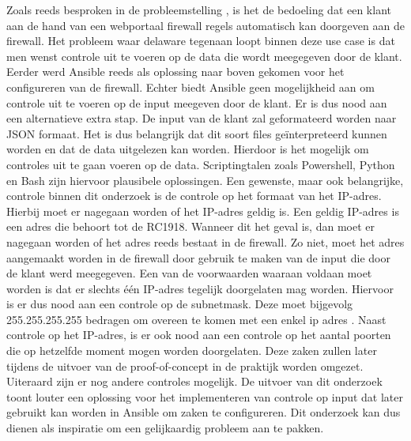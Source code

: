 Zoals reeds besproken in de probleemstelling , is het de bedoeling dat een klant aan de hand van een webportaal firewall regels automatisch kan doorgeven aan de firewall. Het probleem waar delaware tegenaan loopt binnen deze use case is dat men wenst controle uit te voeren op de data die wordt meegegeven door de klant. Eerder werd Ansible reeds als oplossing naar boven gekomen voor het configureren van de firewall. Echter biedt Ansible geen mogelijkheid aan om controle uit te voeren op de input meegeven door de klant. Er is dus nood aan een alternatieve extra stap. De input van de klant zal geformateerd worden naar JSON formaat. Het is dus belangrijk dat dit soort files geïnterpreteerd kunnen worden en dat de data uitgelezen kan worden. Hierdoor is het mogelijk om controles uit te gaan voeren op de data. Scriptingtalen zoals Powershell, Python en Bash zijn hiervoor plausibele oplossingen. %
 Een gewenste, maar ook belangrijke, controle binnen dit onderzoek is de controle op het formaat van het IP-adres. Hierbij moet er nagegaan worden of het IP-adres geldig is. Een geldig IP-adres is een adres die behoort tot de RC1918. 
 Wanneer dit het geval is, dan moet er nagegaan worden of het adres reeds bestaat in de firewall. Zo niet, moet het adres aangemaakt worden in de firewall door gebruik te maken van de input die door de klant werd meegegeven. Een van de voorwaarden waaraan voldaan moet worden is dat er slechts één IP-adres tegelijk doorgelaten mag worden. Hiervoor is er dus nood aan een controle op de subnetmask. Deze moet bijgevolg 255.255.255.255 bedragen om overeen te komen met een enkel ip adres \autocite{StackExchange2020}. Naast controle op het IP-adres, is er ook nood aan een controle op het aantal poorten die op hetzelfde moment mogen worden doorgelaten.  Deze zaken zullen later tijdens de uitvoer van de proof-of-concept in de praktijk worden omgezet. Uiteraard zijn er nog andere controles mogelijk. De uitvoer van dit onderzoek toont louter een oplossing voor het implementeren van controle op input dat later gebruikt kan worden in Ansible om zaken te configureren. Dit onderzoek kan dus dienen als inspiratie om een gelijkaardig probleem aan te pakken. 



